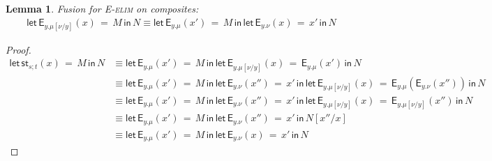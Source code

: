 \documentclass[10pt]{article}
\newtheorem{lemma}{Lemma}
\theoremstyle{definition}
\newcommand\StI[2]{\ensuremath{\mathsf{st}_{#1}(#2)}}
\newcommand\StE[4]{\ensuremath{\mathsf{let} \, \StI{#1}{#3} \, = \, {#2} \, \mathsf{in} \, #4}}
\newcommand\EEs[4]{\ensuremath{\mathsf{let} \, \mathsf{E}_{#1}(#3) \, = \, {#2} \, \mathsf{in} \, #4}}
\newcommand\EIs[2]{\ensuremath{\mathsf{E}_{#1}{(#2)}}}
\newcommand\TrPlus[2]{\ensuremath{{#1}^+(#2)}}
\begin{document}
\begin{lemma}\label{lem:s-elim-fusion}
Fusion for \textsc{E-elim} on composites:
\begin{align*}
\EEs{y.\mu[\nu/y]}{M}{x}{N} \equiv \EEs{y.\mu}{M}{x'}{\EEs{y.\nu}{x'}{x}{N}}
\end{align*}
\end{lemma}
\begin{proof}
\begin{align*}
\StE{s;t}{M}{x}{N}
&\equiv \EEs{y.\mu}{M}{x'}{\EEs{y.\mu[\nu/y]}{\EIs{y.\mu}{x'}}{x}{N}} \\
&\equiv \EEs{y.\mu}{M}{x'}{\EEs{y.\nu}{x'}{x''}{\EEs{y.\mu[\nu/y]}{\EIs{y.\mu}{\EIs{y.\nu}{x''}}}{x}{N}}} \\
&\equiv \EEs{y.\mu}{M}{x'}{\EEs{y.\nu}{x'}{x''}{\EEs{y.\mu[\nu/y]}{\EIs{y.\mu[\nu/y]}{x''}}{x}{N}}} \\
&\equiv \EEs{y.\mu}{M}{x'}{\EEs{y.\nu}{x'}{x''}{N[x''/x]}} \\
&\equiv \EEs{y.\mu}{M}{x'}{\EEs{y.\nu}{x'}{x}{N}}
\end{align*}
\end{proof}

\end{document}

